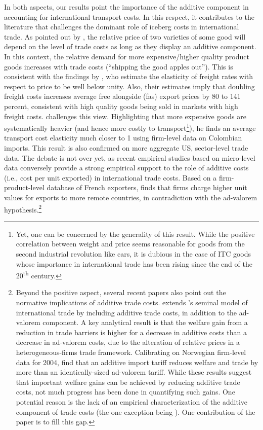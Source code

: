 \documentclass[a4paper,11pt]{article}
\begin{document}
In both aspects, our results point the importance of the additive component in accounting for international transport costs. In this respect, it contributes to the literature that challenges the dominant role of iceberg costs in international trade. As pointed out by \cite{alchian}, the relative price of two varieties of some good will depend on the level of trade costs as long as they display an additive component. In this context, the relative demand for more expensive/higher quality product goods increases with trade costs (``shipping the good apples out''). This is consistent with the findings by \citet{hummels_skiba}, who estimate the elasticity of freight rates with respect to price to be well below unity. Also, their estimates imply that doubling freight costs increases average free alongside (fas) export prices by 80 to 141 percent, consistent with high quality goods being sold in markets with high freight costs. \citet{Lashkaripour-mimeo-2017} challenges this view. Highlighting that more expensive goods are systematically heavier (and hence more costly to transport\footnote{Yet, one can be concerned by the generality of this result. While the positive correlation between weight and price seems reasonable for goods from the second industrial revolution like cars, it is dubious in the case of ITC goods whose importance in international trade has been rising since the end of the 20\textsuperscript{th} century.}), he finds an average transport cost elasticity much closer to 1 using firm-level data on Colombian imports. This result is also confirmed on more aggregate US, sector-level trade data. The debate is not over yet, as recent empirical studies based on micro-level data conversely provide a strong empirical support to the role of additive costs (i.e., cost per unit exported) in international trade costs. Based on a firm-product-level database of French exporters, \citet{martin2012} finds that firms charge higher unit values for exports to more remote countries, in contradiction with the ad-valorem hypothesis.\footnote{Beyond the positive aspect, several recent papers also point out the normative implications of additive trade costs. \citet{sorensen2014} extends \citet{melitz}'s seminal model of international trade by including additive trade costs, in addition to the ad-valorem component. A key analytical result is that the welfare gain from a reduction in trade barriers is higher for a decrease in additive costs than a decrease in ad-valorem costs, due to the alteration of relative prices in a heterogeneous-firms trade framework. Calibrating on Norwegian firm-level data for 2004, \citet{Irrazabal_2015} find that an additive import tariff reduces welfare and trade by more than an identically-sized ad-valorem tariff. While these results suggest that important welfare gains can be achieved by reducing additive trade costs, not much progress has been done in quantifying such gains. One potential reason is the lack of an empirical characterization of the additive component of trade costs (the one exception being \citet{Irrazabal_2015}). One contribution of the paper is to fill this gap.}
\end{document}
